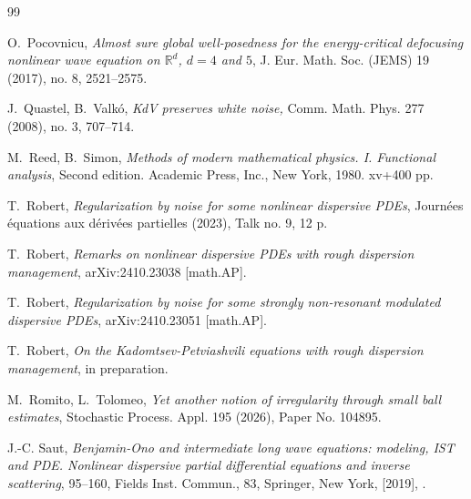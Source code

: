 \documentclass[letterpaper, 11pt,  reqno]{amsart}
\newcommand{\1}{\hspace{0.5mm}\text{I}\hspace{0.5mm}}
\newcommand{\R}{\mathbb{R}}
\numberwithin{equation}{section}
\numberwithin{theorem}{section}
\begin{document}
\begin{thebibliography}{99}
%
%
%
%

O.~Pocovnicu, 
{\it Almost sure global well-posedness for the energy-critical defocusing nonlinear wave equation on $\R^d$,
 $d = 4$ and $5$}, J. Eur. Math. Soc. (JEMS) 19 (2017), no. 8, 2521--2575.


J.~Quastel, B.~Valk\'o, 
{\it KdV preserves white noise,} Comm. Math. Phys. 277 (2008), no. 3, 707--714.



M.~Reed, B.~Simon, 
{\it  Methods of modern mathematical physics. I. Functional analysis}, 
Second edition. Academic Press, Inc., New York, 1980. xv+400 pp.




T.~Robert, 
{\it Regularization by noise for some nonlinear dispersive PDEs},
 Journ\'ees \'equations aux d\'eriv\'ees partielles (2023), Talk no. 9, 12 p. 





T.~Robert, 
{\it Remarks on nonlinear dispersive PDEs with rough dispersion management}, 
arXiv:2410.23038 [math.AP].




T.~Robert, 
{\it Regularization by noise for some strongly non-resonant modulated dispersive PDEs}, 
arXiv:2410.23051 [math.AP].


T.~Robert, 
{\it  On the Kadomtsev-Petviashvili equations with rough dispersion management}, 
 in preparation.



M.~Romito, L.~Tolomeo, 
{\it Yet another notion of irregularity through small ball estimates},
 Stochastic Process. Appl. 195 (2026), Paper No. 104895.


%
%
%
	
J.-C. Saut,
 {\it Benjamin-Ono and intermediate long wave equations: modeling, IST and PDE. Nonlinear
dispersive partial differential equations and inverse scattering}, 
95--160, Fields Inst. Commun., 83, Springer, New York, [2019], .
	


%
%



\end{thebibliography}
\end{document}
